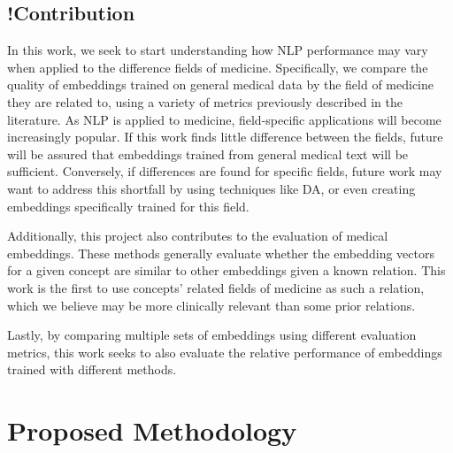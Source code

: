 \documentclass[10pt]{article}
\begin{document}
\subsection{!Contribution}



In this work, we seek to start understanding how NLP performance may vary when applied to the difference fields of medicine. Specifically, we compare the quality of embeddings trained on general medical data by the field of medicine they are related to, using a variety of metrics previously described in the literature. As NLP is applied to medicine, field-specific applications will become increasingly popular. If this work finds little difference between the fields, future will be assured that embeddings trained from general medical text will be sufficient. Conversely, if differences are found for specific fields, future work may want to address this shortfall by using techniques like DA, or even creating embeddings specifically trained for this field. 

Additionally, this project also contributes to the evaluation of medical embeddings. These methods generally evaluate whether the embedding vectors for a given concept are similar to other embeddings given a known relation. This work is the first to use concepts' related fields of medicine as such a relation, which we believe may be more clinically relevant than some prior relations. 

Lastly, by comparing multiple sets of embeddings using different evaluation metrics, this work seeks to also evaluate the relative performance of embeddings trained with different methods. 

\section{Proposed Methodology}
\end{document}
